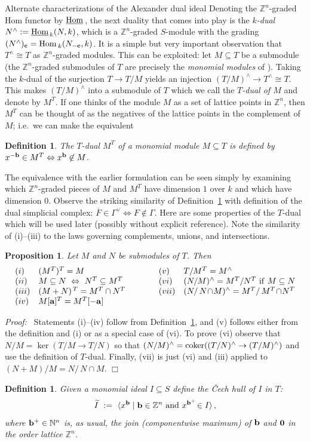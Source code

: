\documentclass[12pt,leqno]{article}
\newtheorem{defn}[thm]{Definition}
\newtheorem{prop}[thm]{Proposition}
\def\<{{\langle}}
\def\>{{\rangle}}
\def\hhom{{{\underline{\rm Hom}}{\scriptscriptstyle \,}}}
\def\aa{{{\rm \bf a}}}
\def\bb{{{\rm \bf b}}}
\def\cc{{{\rm \bf c}}}
\def\NN{{\mathbb N}}
\def\ZZ{{\mathbb Z}}
\begin{document}
\begin{section}{Alternate characterizations of the Alexander dual ideal}
Denoting the $\ZZ^n$-graded Hom functor by $\hhom$, the next duality that
comes into play is the {\it $k$-dual} $N^\wedge := \hhom_k(N,k)$, which
is a $\ZZ^n$-graded $S$-module with the grading $(N^\wedge)_\cc = {\rm
Hom_{\,}}_k (N_{-\cc},k)$.  It is a simple but very important observation
that $T^\wedge \cong T$ as $\ZZ^n$-graded modules.  This can be
exploited: let $M \subseteq T$ be a submodule (the $\ZZ^n$-graded
submodules of $T$ are precisely the {\it monomial modules} of \cite{BS}).
Taking the $k$-dual of the surjection $T \to T/M$ yields an injection
$(T/M)^\wedge \to T^\wedge \cong T$.  This makes $(T/M)^\wedge$ into a
submodule of $T$ which we call the {\it $T$-dual of $M$} and denote by
$M^T$.  If one thinks of the module $M$ as a set of lattice points in
$\ZZ^n$, then $M^T$ can be thought of as the negatives of the lattice
points in the complement of $M$; i.e.\ we can make the equivalent
\begin{defn} \label{defn:T-dual}
The $T$-{\rm dual} $M^T$ of a monomial module $M \subseteq T$ is defined
by $x^{-\bb} \in M^T \Leftrightarrow x^\bb \not\in M$.
\end{defn}
The equivalence with the earlier formulation can be seen simply by
examining which $\ZZ^n$-graded pieces of $M$ and $M^T$ have dimension $1$
over $k$ and which have dimension $0$.  Observe the striking similarity
of Definition~\ref{defn:T-dual} with definition of the dual simplicial
complex: $\overline{F} \in \Gamma^\vee \Leftrightarrow F \not\in \Gamma$.
Here are some properties of the $T$-dual which will be used later
(possibly without explicit reference).  Note the similarity of (i)--(iii)
to the laws governing complements, unions, and intersections.

\begin{prop} \label{prop:T-dual}
Let $M$ and $N$ be submodules of $T$.  Then
$$
\begin{array}{llcll}
(i)	& (M^T)^T = M &
\qquad&	(v)	& T/M^T = M^\wedge \cr
(ii)	& M \subseteq N \ \Leftrightarrow \ N^T \subseteq M^T &
\qquad&	(vi)	& (N/M)^\wedge = M^T/N^T\ {\rm if\ } M \subseteq N \cr
(iii)	& (M+N)^{\,T} = M^T \cap N^T &
\qquad&	(vii)	& (N/\,N\!\cap\!M)^\wedge = M^T /\,M^T\!\cap\!N^T \cr
(iv)	& M[\aa]^T = M^T[-\aa] \cr
\end{array}
$$
\end{prop}
{\it Proof:\ } Statements (i)--(iv) follow from
Definition~\ref{defn:T-dual}, and (v) follows either from the definition
and (i) or as a special case of (vi).  To prove (vi) observe that $N/M =
\ker(T/M \to T/N)$ so that $(N/M)^\wedge = {\rm coker}((T/N)^\wedge \to
(T/M)^\wedge)$ and use the definition of $T$-dual.  Finally, (vii) is
just (vi) and (iii) applied to $(N+M)/M = N/\,N\!\cap\!M$.
%
\hfill
$\Box$
\begin{defn}
Given a monomial ideal $I \subseteq S$ define the {\rm \v Cech hull of
$I$} in $T$:
$$
	\widetilde{I}\ :=\ \< x^\bb \mid \bb \in \ZZ^n\ {\rm and}\
	x^{\bb^+}\! \in I \>\,,
$$
where $\bb^+ \in \NN^n$ is, as usual, the join (componentwise maximum) of
$\bb$ and ${\bf 0}$ in the order lattice $\ZZ^n$.
\end{defn}


\end{section}
\end{document}
